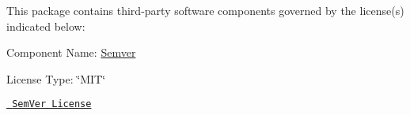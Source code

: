 This package contains third-\/party software components governed by the license(s) indicated below\+:

Component Name\+: \mbox{\hyperlink{namespace_semver}{Semver}}

License Type\+: \char`\"{}\+M\+I\+T\char`\"{}

\href{https://github.com/maxhauser/semver/blob/master/License.txt}{\texttt{ Sem\+Ver License}} 